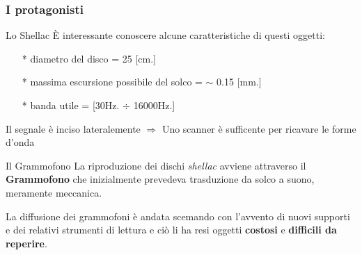 \begin{frame}

\frametitle{I protagonisti}

\begin{block}{Lo Shellac}
\`E interessante conoscere alcune caratteristiche di questi oggetti:
\begin{itemize}
\item[*]diametro del disco = 25 [cm.]
\item[*]massima escursione possibile del solco = $\sim$ 0.15 [mm.]
\item[*]banda utile = [30Hz. $\div$ 16000Hz.]
\end{itemize}
Il segnale è inciso lateralemente $\Rightarrow$ Uno scanner è 
sufficente per ricavare le forme d'onda
\end{block}

\begin{block}{Il Grammofono}
La riproduzione dei dischi \emph{shellac} avviene attraverso il \textbf{Grammofono}
che inizialmente prevedeva trasduzione da solco
a suono, meramente meccanica.

La diffusione dei grammofoni è andata scemando con l'avvento di nuovi supporti
e dei relativi strumenti di lettura e ciò li ha resi oggetti \textbf{costosi}
e \textbf{difficili da reperire}.
\end{block}

\end{frame}


